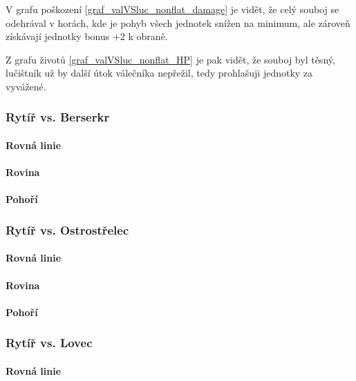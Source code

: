 V grafu poškození \ref{graf_valVSluc_nonflat_damage} je vidět, že celý souboj se odehrával v horách, kde je pohyb všech jednotek snížen na minimum, ale zároveň získávají jednotky bonus $+2$ k obraně. 

Z grafu životů \ref{graf_valVSluc_nonflat_HP} je pak vidět, že souboj byl těsný, lučištník už by další útok válečníka nepřežil, tedy prohlašuji jednotky za vyvážené.

\subsubsection{Rytíř vs. Berserkr}

\paragraph{Rovná linie}

\paragraph{Rovina}

\paragraph{Pohoří}

\subsubsection{Rytíř vs. Ostrostřelec}

\paragraph{Rovná linie}

\paragraph{Rovina}

\paragraph{Pohoří}

\subsubsection{Rytíř vs. Lovec}

\paragraph{Rovná linie}

